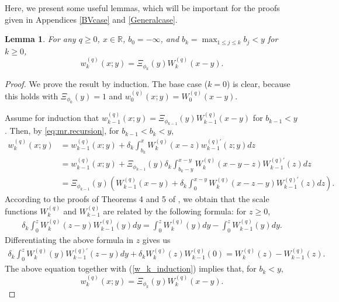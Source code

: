 \documentclass[12pt,reqno]{amsart}
\newcommand{\red}{\textcolor[rgb]{1.00,0.00,0.00}}
\newcommand{\blue}{\textcolor[rgb]{0.00,0.00,1.00}}
\newcommand{\green}{\textcolor[rgb]{0.00,0.70,.30}}
\newtheorem{lemma}[theorem]{Lemma}
\theoremstyle{definition}
\theoremstyle{remark}
\begin{document}
Here, we present some useful lemmas, which will be important for the proofs given in Appendices
\ref{BVcase} and \ref{Generalcase}.
\begin{lemma}\label{w_k_above_b_k_lemma}
For any  $q\geq 0$, $x\in\mathbb{R}$, $b_0=-\infty$, and $b_k = \max_{1 \leq j \leq k} b_j <y$ for $k \geq 0$,
\begin{equation}\label{w_k_above_b_k}
w_k^{(q)}(x;y)=\Xi_{\phi_k}(y) W_k^{(q)}(x-y). 
\end{equation}
\end{lemma}
\begin{proof}


We prove the result by induction. The base case ($k=0$) is clear, because this holds with $\Xi_{\phi_0}(y) = 1$ and $w_0^{(q)}(x;y) = W_0^{(q)}(x-y)$. 



Assume for induction that $w_{k-1}^{(q)}(x;y)=\Xi_{\phi_{k-1}}(y)W_{k-1}^{(q)}(x-y)$ for $b_{k-1} < y$. Then, by \eqref{eq:mr.recursion}, for $b_{k-1} < b_k < y$,
\begin{align}\label{w_k_induction}\nonumber
w_k^{(q)}(x;y)&=w_{k-1}^{(q)}(x;y)+\delta_k\int_{b_k}^xW_k^{(q)}(x-z)w_{k-1}^{(q)\prime}(z;y)dz\\\nonumber
&=w_{k-1}^{(q)}(x;y)+\Xi_{\phi_{k-1}}(y) \delta_k\int_{b_k-y}^{x-y}W_k^{(q)}(x-y-z)W_{k-1}^{(q)\prime}(z)dz\\
&=\Xi_{\phi_{k-1}}(y)\left(W_{k-1}^{(q)}(x-y)+\delta_k  \int_{0}^{x-y}W_k^{(q)}(x-z-y)W_{k-1}^{(q)\prime}(z)dz\right).
\end{align}
According to the proofs of Theorems 4 and 5 of \cite{kyprianouloeffen2010}, we obtain that  the scale functions $W_k^{(q)}$ and $W_{k-1}^{(q)}$ are related by the following formula: for $z\geq 0$,
\begin{align}\label{useful_inedity2}
\delta_k\int_0^z W_{k}^{(q)}(z-y)W_{k-1}^{(q)}(y)dy=\int_0^z W_k^{(q)}(y)dy-\int_0^z W_{k-1}^{(q)}(y)dy.
\end{align}
Differentiating the above formula in $z$ gives us 
\begin{align*}
\delta_k\int_0^z W_k^{(q)}(y)W_{k-1}^{(q)\prime}(z-y)dy+\delta_kW^{(q)}_k(z)W_{k-1}^{(q)}(0)=W_{k}^{(q)}(z)-W_{k-1}^{(q)}(z).
\end{align*}
The above equation together with (\ref{w_k_induction}) implies that, for $b_k<y$,
\[
w_k^{(q)}(x;y)=\Xi_{\phi_k}(y)W_k^{(q)}(x-y).
\]
\end{proof}
\end{document}
